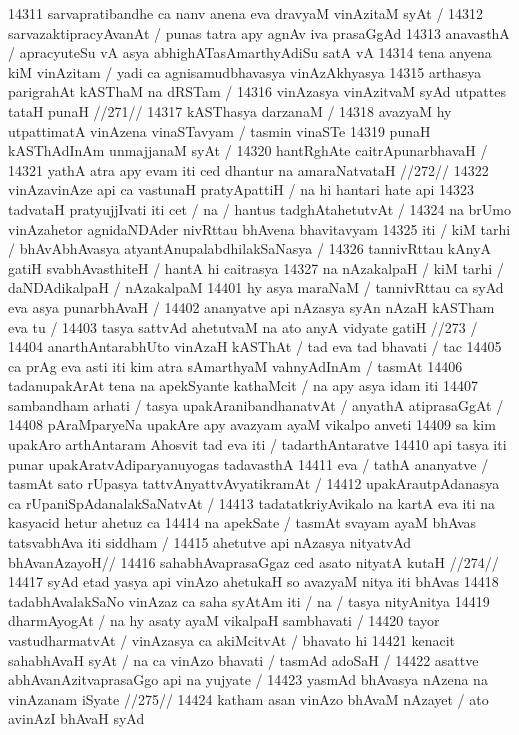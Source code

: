 14311 sarvapratibandhe ca nanv anena eva dravyaM vinAzitaM syAt /
14312 sarvazaktipracyAvanAt / punas tatra apy agnAv iva prasaGgAd
14313 anavasthA / apracyuteSu vA asya abhighATasAmarthyAdiSu satA vA  
14314 tena anyena kiM vinAzitam / yadi ca agnisamudbhavasya vinAzAkhyasya 
14315 arthasya parigrahAt kASThaM na dRSTam /
14316 	vinAzasya vinAzitvaM syAd utpattes tataH punaH //271//
14317 	kASThasya darzanaM /  
14318 avazyaM hy utpattimatA vinAzena vinaSTavyam / tasmin vinaSTe
14319 punaH kASThAdInAm unmajjanaM syAt /  
14320 	hantRghAte caitrApunarbhavaH /  
14321 	yathA atra apy evam iti ced dhantur na amaraNatvataH //272//  
14322 vinAzavinAze api ca vastunaH pratyApattiH / na hi hantari hate api 
14323 tadvataH pratyujjIvati iti cet / na / hantus tadghAtahetutvAt /
14324 na brUmo vinAzahetor agnidaNDAder nivRttau bhAvena bhavitavyam 
14325 iti / kiM tarhi / bhAvAbhAvasya atyantAnupalabdhilakSaNasya /
14326 tannivRttau kAnyA gatiH svabhAvasthiteH / hantA hi caitrasya  
14327 na nAzakalpaH / kiM tarhi / daNDAdikalpaH / nAzakalpaM
14401 hy asya maraNaM / tannivRttau ca syAd eva asya punarbhAvaH /  
14402 	ananyatve api nAzasya syAn nAzaH kASTham eva tu / 
14403 	tasya sattvAd ahetutvaM na ato anyA vidyate gatiH //273  /  
14404 anarthAntarabhUto vinAzaH kASThAt / tad eva tad bhavati / tac
14405 ca prAg eva asti iti kim atra sAmarthyaM vahnyAdInAm / tasmAt
14406 tadanupakArAt tena na apekSyante kathaMcit / na apy asya idam iti
14407 sambandham arhati / tasya upakAranibandhanatvAt / anyathA  atiprasaGgAt /
14408 pAraMparyeNa upakAre apy avazyam ayaM vikalpo anveti  
14409 sa kim upakAro arthAntaram Ahosvit tad eva iti / tadarthAntaratve
14410 api tasya iti punar upakAratvAdiparyanuyogas tadavasthA
14411 eva / tathA ananyatve / tasmAt sato rUpasya tattvAnyattvAvyatikramAt /
14412 upakArautpAdanasya ca rUpaniSpAdanalakSaNatvAt /
14413 tadatatkriyAvikalo na kartA eva iti na kasyacid hetur ahetuz ca
14414 na apekSate / tasmAt svayam ayaM bhAvas tatsvabhAva iti siddham /  
14415 	ahetutve api nAzasya nityatvAd bhAvanAzayoH// 
14416 	sahabhAvaprasaGgaz ced asato nityatA kutaH //274// 
14417 syAd etad yasya api vinAzo ahetukaH so avazyaM nitya iti bhAvas  
14418 tadabhAvalakSaNo vinAzaz ca saha syAtAm iti / na / tasya nityAnitya
14419 dharmAyogAt / na hy asaty ayaM vikalpaH sambhavati / 
14420 tayor vastudharmatvAt / vinAzasya ca akiMcitvAt / bhavato hi 
14421 kenacit sahabhAvaH syAt / na ca vinAzo bhavati / tasmAd adoSaH /
14422 	asattve abhAvanAzitvaprasaGgo api na yujyate / 
14423 	yasmAd bhAvasya nAzena na vinAzanam iSyate //275//
14424 katham asan vinAzo bhAvaM nAzayet / ato avinAzI bhAvaH syAd  
